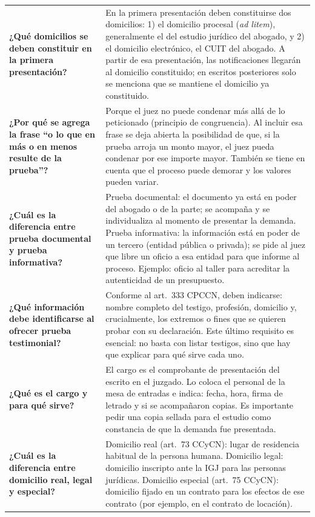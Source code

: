 \documentclass[12pt,oneside]{book}
\begin{document}
\begin{longtable}{
    >{\raggedright\arraybackslash}p{}
    >{\raggedright\arraybackslash}p{}
}
\textbf{¿Qué domicilios se deben constituir en la primera presentación?} &
En la primera presentación deben constituirse dos domicilios: 1) el domicilio procesal (\textit{ad litem}), generalmente el del estudio jurídico del abogado, y 2) el domicilio electrónico, el CUIT del abogado. A partir de esa presentación, las notificaciones llegarán al domicilio constituido; en escritos posteriores solo se menciona que se mantiene el domicilio ya constituido. \\

\textbf{¿Por qué se agrega la frase ``o lo que en más o en menos resulte de la prueba''?} &
Porque el juez no puede condenar más allá de lo peticionado (principio de congruencia). Al incluir esa frase se deja abierta la posibilidad de que, si la prueba arroja un monto mayor, el juez pueda condenar por ese importe mayor. También se tiene en cuenta que el proceso puede demorar y los valores pueden variar. \\

\textbf{¿Cuál es la diferencia entre prueba documental y prueba informativa?} &
Prueba documental: el documento ya está en poder del abogado o de la parte; se acompaña y se individualiza al momento de presentar la demanda. Prueba informativa: la información está en poder de un tercero (entidad pública o privada); se pide al juez que libre un oficio a esa entidad para que informe al proceso. Ejemplo: oficio al taller para acreditar la autenticidad de un presupuesto. \\

\textbf{¿Qué información debe identificarse al ofrecer prueba testimonial?} &
Conforme al art.\ 333 CPCCN, deben indicarse: nombre completo del testigo, profesión, domicilio y, crucialmente, los extremos o fines que se quieren probar con su declaración. Este último requisito es esencial: no basta con listar testigos, sino que hay que explicar para qué sirve cada uno. \\

\textbf{¿Qué es el cargo y para qué sirve?} &
El cargo es el comprobante de presentación del escrito en el juzgado. Lo coloca el personal de la mesa de entradas e indica: fecha, hora, firma de letrado y si se acompañaron copias. Es importante pedir una copia sellada para el estudio como constancia de que la demanda fue presentada. \\

\textbf{¿Cuál es la diferencia entre domicilio real, legal y especial?} &
Domicilio real (art.\ 73 CCyCN): lugar de residencia habitual de la persona humana. Domicilio legal: domicilio inscripto ante la IGJ para las personas jurídicas. Domicilio especial (art.\ 75 CCyCN): domicilio fijado en un contrato para los efectos de ese contrato (por ejemplo, en el contrato de locación). \\


\end{longtable}
\end{document}
